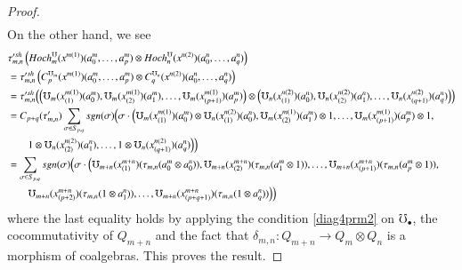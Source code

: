 \documentclass[10pt, colorlinks]{article}
\numberwithin{equation}{section} \DeclareMathSizes{2}{10}{12}{13}
\begin{document}
\begin{proof}
\begin{align}
       \end{align}
       On the other hand, we see
       \begin{align*}
           &\tau'^{sh}_{m,n}\left(Hoch^{\mho}_{m}(x^{m(1)})(a^m_0,\ldots, a^m_p)\otimes Hoch^{\mho}_n(x^{n(2)})(a^n_0,\ldots, a_q^n)\right)\\
           &=\tau'^{sh}_{m,n}\left(C_p^{\mho_m}(x^{m(1)})(a^m_0,\ldots, a^m_p)\otimes C_q^{\mho_n}(x^{n(2)})(a^n_0,\ldots, a^n_q)\right)\\
           &=\tau'^{sh}_{m,n}\Big(\Big(\mho_{m}(x^{m(1)}_{(1)})(a^m_0),\mho_{m}(x^{m(1)}_{(2)})(a^m_1),\ldots, \mho_{m}(x^{m(1)}_{(p+1)})(a^m_p)\Big)\otimes \Big(\mho_{n}(x^{n(2)}_{(1)})(a^n_0), \mho_{n}(x^{n(2)}_{(2)})(a^n_1),\ldots,\mho_{n}(x^{n(2)}_{(q+1)})(a^n_q)\Big)\Big)\\
           &=C_{p+q}(\tau'_{m,n})\sum_{\sigma\in S_{p,q}}sgn(\sigma)\Big(\sigma\cdot \Big(\mho_{m}(x^{m(1)}_{(1)})(a^m_0)\otimes \mho_{n}(x^{n(2)}_{(1)})(a^n_0),\mho_{m}(x^{m(1)}_{(2)})(a^m_1)\otimes 1,\ldots, \mho_{m}(x^{m(1)}_{(p+1)})(a^m_p)\otimes 1,\\
           &\qquad 1\otimes \mho_{n}(x^{n(2)}_{(2)})(a^n_1),\ldots,1\otimes\mho_{n}(x^{n(2)}_{(q+1)})(a^n_q)\Big)\Big)\notag\\
           &=\sum_{\sigma\in S_{p,q}}sgn(\sigma)\Big(\sigma\cdot\Big(\mho_{m+n}(x^{m+n}_{(1)})(\tau_{m,n}(a^m_0\otimes a_0^n)),\mho_{m+n}(x^{m+n}_{(2)})(\tau_{m,n}(a^m_1\otimes1)),\ldots,\mho_{m+n}(x^{m+n}_{(p+1)})(\tau_{m,n}(a^m_p\otimes 1)),\\
           &\qquad\mho_{m+n}(x^{m+n}_{(p+2)})(\tau_{m,n}(1\otimes a^n_1)),\ldots ,\mho_{m+n}(x^{m+n}_{(p+q+1)})(\tau_{m,n}(1\otimes a_q^n))\Big)\Big)\notag
       \end{align*}
       where the last equality holds by applying the condition \eqref{diag4prm2} on $\mho_\bullet$, the cocommutativity of $Q_{m+n}$ and the fact that 
       $\delta_{m,n}:Q_{m
+n}\longrightarrow Q_m\otimes Q_n$ is a morphism of coalgebras. This proves the result. 
\end{proof}
\end{document}
